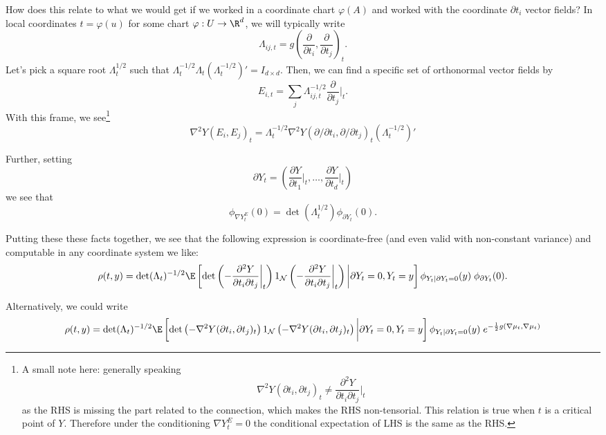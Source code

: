\documentclass{article}
\begin{document}
How does this relate to what we would get if we worked in a coordinate chart $\varphi(A)$ and worked with the coordinate $\partial t_i$ vector fields? In local coordinates $t=\varphi(u)$ for some chart
$\varphi:U \to \R^d$, we will
typically write
\begin{equation}
\Lambda_{ij,t} = g\left(\frac{\partial}{\partial t_i}, \frac{\partial}{\partial t_j}\right)_t.
  \end{equation}
Let's pick a square root $\Lambda_t^{1/2}$ such that $\Lambda_t^{-1/2} \Lambda_t (\Lambda_t^{-1/2})'=I_{d \times d}$. Then, we can find a specific set of orthonormal vector fields by
$$
E_{i,t} = \sum_j \Lambda^{-1/2}_{ij,t} \frac{\partial}{\partial t_j} \biggl|_t.
$$
With this frame, we see\footnote{A small note here: generally speaking
\begin{equation}
\nabla^2 Y(\partial t_i, \partial t_j)_t \neq \frac{\partial^2 Y}{\partial t_i \partial t_j}\biggl|_t
  \end{equation}
as the RHS is missing the part related to the connection, which makes the RHS non-tensorial. This relation is true
when $t$ is a critical point of $Y$. Therefore under the conditioning
$\nabla Y^E_t=0$ the conditional expectation of LHS is the same as the RHS.}
$$
\nabla^2 Y(E_i,E_j)_t = \Lambda^{-1/2}_t \nabla^2 Y(\partial/\partial t_i, \partial/\partial t_j)_t (\Lambda^{-1/2}_t)'
$$

Further, setting
$$
\partial Y_t = \left(\frac{\partial Y}{\partial t_1}\biggl|_t, \dots, \frac{\partial Y}{\partial t_d}\biggl|_t \right)
$$
we see that
$$
\phi_{\nabla Y_t^E}(0) = \det(\Lambda_t^{1/2}) \phi_{\partial Y_t}(0).
$$

Putting these these facts together, we see that the following expression is coordinate-free (and even valid with non-constant variance) and computable in any coordinate system we like:
$$
\begin{aligned}
\rho(t,y) = \det(\Lambda_t)^{-1/2} \E \left[\det\left(-\frac{\partial^2 Y}{\partial t_i \partial t_j} \biggl|_t\right) 1_{{\cal N}}\left(-\frac{\partial^2 Y}{\partial t_i \partial t_j} \biggl|_t \right) \biggl \vert \partial Y_t=0, Y_t=y\right] \phi_{Y_t|\partial Y_t=0}(y) \; \phi_{\partial Y_t}(0).
\end{aligned}
$$

Alternatively, we could write
$$
\begin{aligned}
\rho(t,y) = \det(\Lambda_t)^{-1/2} \E \left[\det\left(-\nabla^2 Y(\partial t_i, \partial t_j)_t\right) 1_{{\cal N}}\left(-\nabla^2 Y(\partial t_i, \partial t_j)_t \right) \biggl \vert \partial Y_t=0, Y_t=y\right] \phi_{Y_t|\partial Y_t=0}(y) \; e^{-\frac{1}{2}g(\nabla \mu_t,\nabla \mu_t)}
\end{aligned}
$$
\end{document}
